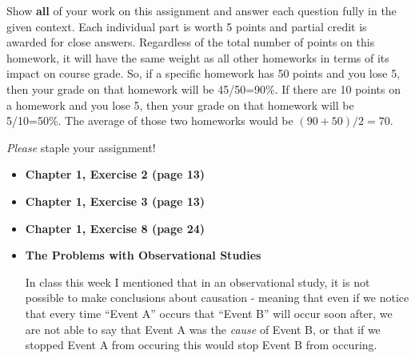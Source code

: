 \documentclass[11pt]{article}\usepackage[]{graphicx}\usepackage[]{color}
\begin{document}
\pagestyle{fancy} 

Show \textbf{all} of your work on this assignment and answer each question fully in the given context. 
Each individual part is worth 5 points and partial credit is awarded for close answers. 
Regardless of the total number of points on this homework, it will have the same weight as all other homeworks in terms of its impact on course grade. 
So, if a specific homework has 50 points and you lose 5, then your grade on that homework will be 45/50=90\%.
If there are 10 points on a homework and you lose 5, then your grade on that homework will be 5/10=50\%.
The average of those two homeworks would be $(90 + 50)/2 = 70$.

\emph{Please} staple your assignment!

\begin{itemize}

\item \textbf{Chapter 1, Exercise 2 (page 13)} \\

\item \textbf{Chapter 1, Exercise 3 (page 13)}\\

\item \textbf{Chapter 1, Exercise 8 (page 24)}

\item \textbf{The Problems with Observational Studies}

In class this week I mentioned that in an observational study, 
it is not possible to make conclusions about causation - meaning that even if we notice that every time ``Event A'' occurs that ``Event B'' will occur soon after, we are not able to say that Event A was the \emph{cause} of Event B, or that if we stopped Event A from occuring this would stop Event B from occuring.


\end{itemize}
\end{document}
